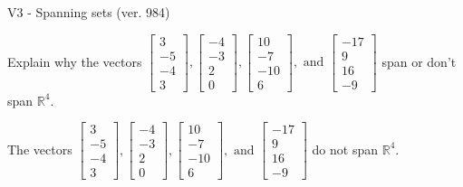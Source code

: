\begin{exercise}
  \begin{exerciseTitle}V3 - Spanning sets (ver. 984)\end{exerciseTitle}
  \begin{exerciseStatement}
    Explain why the vectors \(\left[\begin{array}{r}
3 \\
-5 \\
-4 \\
3
\end{array}\right] , \left[\begin{array}{r}
-4 \\
-3 \\
2 \\
0
\end{array}\right] , \left[\begin{array}{r}
10 \\
-7 \\
-10 \\
6
\end{array}\right] , \text{ and } \left[\begin{array}{r}
-17 \\
9 \\
16 \\
-9
\end{array}\right]\) span or don't span \(\mathbb{R}^4\). 
	


  \end{exerciseStatement}
  \begin{exerciseAnswer}
   The vectors \(\left[\begin{array}{r}
3 \\
-5 \\
-4 \\
3
\end{array}\right] , \left[\begin{array}{r}
-4 \\
-3 \\
2 \\
0
\end{array}\right] , \left[\begin{array}{r}
10 \\
-7 \\
-10 \\
6
\end{array}\right] , \text{ and } \left[\begin{array}{r}
-17 \\
9 \\
16 \\
-9
\end{array}\right]\) 
  	 do not  
	span \(\mathbb{R}^4\).
  


  \end{exerciseAnswer}
\end{exercise}